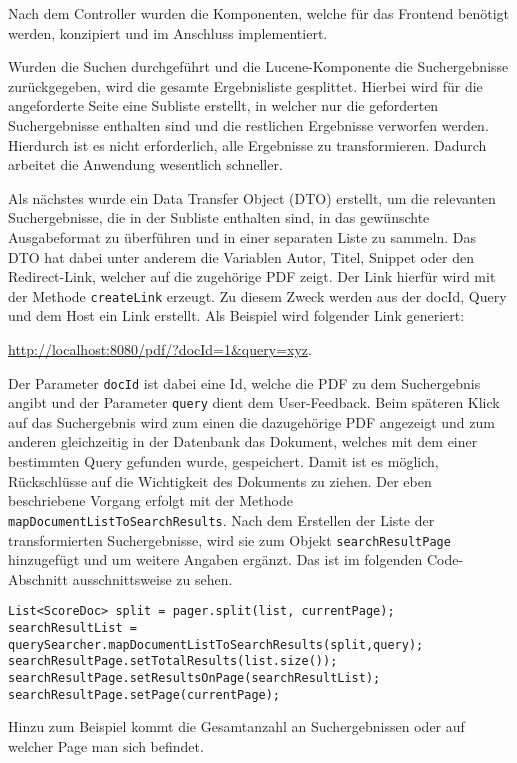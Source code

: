 
Nach dem Controller wurden die Komponenten, welche für das Frontend benötigt werden, konzipiert und im Anschluss implementiert. 

Wurden die Suchen durchgeführt und die Lucene-Komponente die Suchergebnisse zurückgegeben, wird die gesamte Ergebnisliste gesplittet.
Hierbei wird für die angeforderte Seite eine Subliste erstellt, in welcher nur die geforderten Suchergebnisse enthalten sind und die restlichen Ergebnisse verworfen werden.
Hierdurch ist es nicht erforderlich, alle Ergebnisse zu transformieren.
Dadurch arbeitet die Anwendung wesentlich schneller.

Als nächstes wurde ein Data Transfer Object (DTO) erstellt, um die relevanten Suchergebnisse, die in der Subliste enthalten sind, in das gewünschte Ausgabeformat zu überführen und in einer separaten  Liste zu sammeln.
Das DTO hat dabei unter anderem die Variablen Autor, Titel, Snippet oder den Redirect-Link, welcher auf die zugehörige PDF zeigt.   
Der Link hierfür wird mit der Methode \texttt{createLink} erzeugt.
Zu diesem Zweck werden aus der docId, Query und dem Host ein Link erstellt. 
Als Beispiel wird folgender Link generiert:

\url{http://localhost:8080/pdf/?docId=1\&query=xyz}.

Der Parameter \texttt{docId} ist dabei eine Id, welche die PDF zu dem Suchergebnis angibt und der Parameter \texttt{query} dient dem User-Feedback.
Beim späteren Klick auf das Suchergebnis wird zum einen die dazugehörige PDF angezeigt und zum anderen gleichzeitig in der Datenbank das Dokument, welches mit dem einer bestimmten Query gefunden wurde, gespeichert.
Damit ist es möglich, Rückschlüsse auf die Wichtigkeit des Dokuments zu ziehen.
Der eben beschriebene Vorgang erfolgt mit der Methode \texttt{mapDocumentListToSearchResults}.
Nach dem Erstellen der Liste der transformierten Suchergebnisse, wird sie zum Objekt \texttt{searchResultPage} hinzugefügt und um weitere Angaben ergänzt.
Das ist im folgenden Code-Abschnitt ausschnittsweise zu sehen.
\pagebreak

\begin{lstlisting}
List<ScoreDoc> split = pager.split(list, currentPage);
searchResultList = querySearcher.mapDocumentListToSearchResults(split,query);
searchResultPage.setTotalResults(list.size());
searchResultPage.setResultsOnPage(searchResultList);
searchResultPage.setPage(currentPage);
\end{lstlisting}

Hinzu zum Beispiel kommt die Gesamtanzahl an Suchergebnissen oder auf welcher Page man sich befindet.

